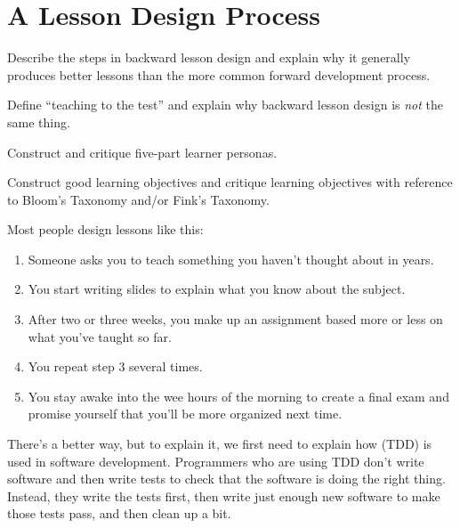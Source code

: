 \chapter{A Lesson Design Process}\label{s:process}

\begin{objectives}

\item Describe the steps in backward lesson design and explain why it
  generally produces better lessons than the more common forward
  development process.

\item Define ``teaching to the test'' and explain why backward lesson
  design is \emph{not} the same thing.

\item Construct and critique five-part learner personas.

\item Construct good learning objectives and critique learning
  objectives with reference to Bloom's Taxonomy and/or Fink's
  Taxonomy.

\end{objectives}

Most people design lessons like this:

\begin{enumerate}

\item
  Someone asks you to teach something you haven't thought about in
  years.

\item
  You start writing slides to explain what you know about the subject.

\item
  After two or three weeks, you make up an assignment based more or
  less on what you've taught so far.

\item
  You repeat step 3 several times.

\item
  You stay awake into the wee hours of the morning to create a final
  exam and promise yourself that you'll be more organized next time.

\end{enumerate}

There's a better way, but to explain it, we first need to explain how
 (TDD) is
used in software development. Programmers who are using TDD don't
write software and then write tests to check that the software is
doing the right thing. Instead, they write the tests first, then write
just enough new software to make those tests pass, and then clean up a
bit.

